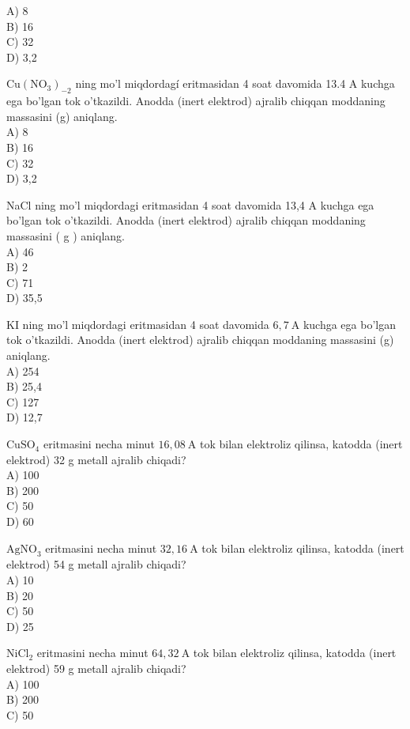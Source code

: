 A) 8\\
B) 16\\
C) 32\\
D) 3,2
  \item $\mathrm{Cu}\left(\mathrm{NO}_{3}\right)_{-2}$ ning mo'l miqdordagí eritmasidan 4 soat davomida 13.4 A kuchga ega bo'lgan tok o'tkazildi. Anodda (inert elektrod) ajralib chiqqan moddaning massasini (g) aniqlang.\\
A) 8\\
B) 16\\
C) 32\\
D) 3,2
  \item NaCl ning mo'l miqdordagi eritmasidan 4 soat davomida 13,4 A kuchga ega bo'lgan tok o'tkazildi. Anodda (inert elektrod) ajralib chiqqan moddaning massasini ( g ) aniqlang.\\
A) 46\\
B) 2\\
C) 71\\
D) 35,5
  \item KI ning mo'l miqdordagi eritmasidan 4 soat davomida $6,7 \mathrm{~A}$ kuchga ega bo'lgan tok o'tkazildi. Anodda (inert elektrod) ajralib chiqqan moddaning massasini (g) aniqlang.\\
A) 254\\
B) 25,4\\
C) 127\\
D) 12,7
  \item $\mathrm{CuSO}_{4}$ eritmasini necha minut $16,08 \mathrm{~A}$ tok bilan elektroliz qilinsa, katodda (inert elektrod) 32 g metall ajralib chiqadi?\\
A) 100\\
B) 200\\
C) 50\\
D) 60\\
  \item $\mathrm{AgNO}_{3}$ eritmasini necha minut $32,16 \mathrm{~A}$ tok bilan elektroliz qilinsa, katodda (inert elektrod) 54 g metall ajralib chiqadi?\\
A) 10\\
B) 20\\
C) 50\\
D) 25
  \item $\mathrm{NiCl}_{2}$ eritmasini necha minut $64,32 \mathrm{~A}$ tok bilan elektroliz qilinsa, katodda (inert elektrod) 59 g metall ajralib chiqadi?\\
A) 100\\
B) 200\\
C) 50\\
